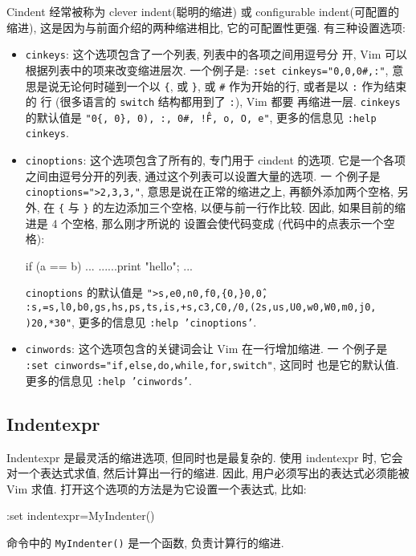 Cindent 经常被称为 clever indent(聪明的缩进) 或 configurable indent(可配置的
缩进), 这是因为与前面介绍的两种缩进相比, 它的可配置性更强. 有三种设置选项:
\begin{itemize}
    \item \texttt{cinkeys}: 这个选项包含了一个列表, 列表中的各项之间用逗号分
        开, Vim 可以根据列表中的项来改变缩进层次. 一个例子是: \texttt{:set
            cinkeys="0{,0},0\#,:"}, 意思是说无论何时碰到一个以 \verb'{', 或
            \verb'}', 或 \verb'#' 作为开始的行, 或者是以 \verb':' 作为结束的
            行 (很多语言的 \texttt{switch} 结构都用到了 \verb':'), Vim 都要
            再缩进一层. \texttt{cinkeys} 的默认值是 \texttt{"0\{, 0\}, 0), :,
        0\#, !\^F, o, O, e"}, 更多的信息见 \texttt{:help cinkeys}.
    \item \texttt{cinoptions}: 这个选项包含了所有的, 专门用于 cindent 的选项.
        它是一个各项之间由逗号分开的列表, 通过这个列表可以设置大量的选项. 一
        个例子是 \texttt{cinoptions=">2,{3,}3,"}, 意思是说在正常的缩进之上,
        再额外添加两个空格, 另外, 在 \verb'{' 与 \verb'}' 的左边添加三个空格,
        以便与前一行作比较. 因此, 如果目前的缩进是 4 个空格, 那么刚才所说的
        设置会使代码变成 (代码中的点表示一个空格):
        \begin{vimcode}
        if (a == b)
        ...{
        ......print "hello";
        ...}
        \end{vimcode}
        \texttt{cinoptions} 的默认值是 \texttt{">s,e0,n0,f0,\{0,\}0,\^0,
        :s,=s,l0,b0,gs,hs,ps,ts,is,+s,c3,C0,/0,(2s,us,U0,w0,W0,m0,j0,
        )20,*30"}, 更多的信息见 \texttt{:help 'cinoptions'}.
    \item \texttt{cinwords}: 这个选项包含的关键词会让 Vim 在一行增加缩进. 一
        个例子是 \texttt{:set cinwords="if,else,do,while,for,switch"}, 这同时
        也是它的默认值. 更多的信息见 \texttt{:help 'cinwords'}.
\end{itemize}

\subsection{Indentexpr}
\label{subsec:indentexpr}

Indentexpr 是最灵活的缩进选项, 但同时也是最复杂的. 使用 indentexpr 时, 它会
对一个表达式求值, 然后计算出一行的缩进. 因此, 用户必须写出的表达式必须能被 Vim
求值. 打开这个选项的方法是为它设置一个表达式, 比如:
\begin{vimcode}
:set indentexpr=MyIndenter()
\end{vimcode}
命令中的 \texttt{MyIndenter()} 是一个函数, 负责计算行的缩进.

